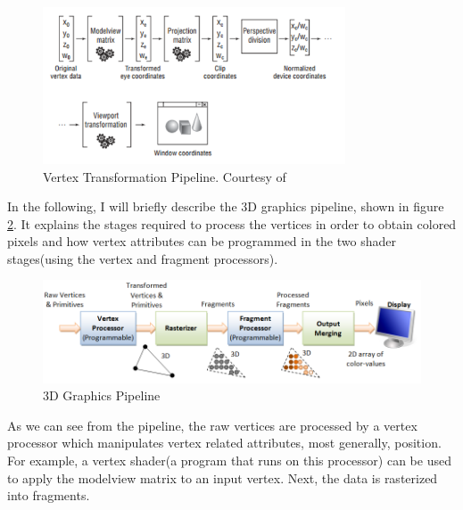 \documentclass[]{article}
\begin{document}
\begin{figure}[hbtp]
    \centering
    \includegraphics[width=0.8\textwidth]{figures/TransformationPipeline.PNG}
    \caption{Vertex Transformation Pipeline. Courtesy of \cite{superbible}}
    \label{fig:TransformationPipeline}
\end{figure}


In the following, I will briefly describe the 3D graphics pipeline, shown in figure \ref{fig:GraphicsPipeline}. It explains the stages required to process the vertices in order to obtain colored pixels and how vertex attributes can be programmed in the two shader stages(using the vertex and fragment processors).

\begin{figure}[hbtp]
    \centering
    \includegraphics[width=1.0\textwidth]{figures/Graphics3D_Pipe2.png}
    \caption{3D Graphics Pipeline}
    \label{fig:GraphicsPipeline}
\end{figure}

As we can see from the pipeline, the raw vertices are processed by a vertex processor which manipulates vertex related attributes, most generally, position. For example, a vertex shader(a program that runs on this processor) can be used to apply the modelview matrix to an input vertex. Next, the data is rasterized into fragments.
 
\end{document}
